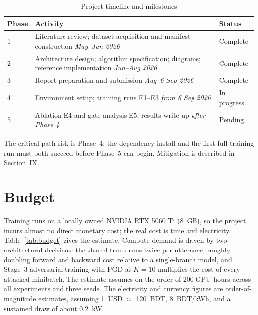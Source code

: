 \documentclass[conference]{IEEEtran}
\begin{document}
\begin{table}[!t]
\caption{Project timeline and milestones}
\label{tab:timeline}
\centering
\renewcommand{\arraystretch}{1.2}
\begin{tabularx}{\columnwidth}{@{}l >{\raggedright\arraybackslash}X l@{}}
\toprule
\textbf{Phase} & \textbf{Activity} & \textbf{Status} \\
\midrule
1 & Literature review; dataset acquisition and manifest construction
    \newline \emph{May--Jun 2026} & Complete \\
2 & Architecture design; algorithm specification; diagrams; reference
    implementation \newline \emph{Jun--Aug 2026} & Complete \\
3 & Report preparation and submission
    \newline \emph{Aug--6 Sep 2026} & Complete \\
4 & Environment setup; training runs E1--E3
    \newline \emph{from 6 Sep 2026} & In progress \\
5 & Ablation E4 and gate analysis E5; results write-up
    \newline \emph{after Phase 4} & Pending \\
\bottomrule
\end{tabularx}
\end{table}

The critical-path risk is Phase~4: the dependency install and the first full
training run must both succeed before Phase~5 can begin. Mitigation is
described in Section~IX.

\section{Budget}
Training runs on a locally owned NVIDIA RTX 5060 Ti (8~GB), so the project
incurs almost no direct monetary cost; the real cost is time and electricity.
Table~\ref{tab:budget} gives the estimate. Compute demand is driven by two
architectural decisions: the shared trunk runs twice per utterance, roughly
doubling forward and backward cost relative to a single-branch model, and
Stage~3 adversarial training with PGD at $K = 10$ multiplies the cost of every
attacked minibatch. The estimate assumes on the order of 200 GPU-hours across
all experiments and three seeds. The electricity and currency figures are
order-of-magnitude estimates, assuming 1~USD $\approx$ 120~BDT, 8~BDT/kWh,
and a sustained draw of about 0.2~kW.
\end{document}
